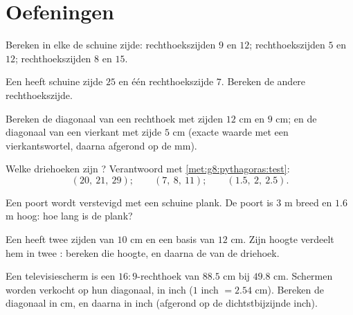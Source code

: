 \section{Oefeningen}

\begin{exercise}[$\star$]\label{exo:g8:pythagoras:1}
Bereken in elke  de schuine zijde:
rechthoekszijden $9$ en $12$; \quad rechthoekszijden $5$ en $12$; \quad
rechthoekszijden $8$ en $15$.
\end{exercise}

\begin{exercise}[$\star$]\label{exo:g8:pythagoras:2}
Een  heeft schuine zijde $25$ en één rechthoekszijde $7$.
Bereken de andere rechthoekszijde.
\end{exercise}

\begin{exercise}[$\star$]\label{exo:g8:pythagoras:3}
Bereken de diagonaal van een rechthoek met zijden $12$ cm en $9$ cm; en de
diagonaal van een vierkant met zijde $5$ cm (exacte waarde met een
vierkantswortel, daarna afgerond op de mm).
\end{exercise}

\begin{exercise}[$\star$]\label{exo:g8:pythagoras:4}
Welke driehoeken zijn ? Verantwoord met
\cref{met:g8:pythagoras:test}:
\[
(20,\ 21,\ 29); \qquad
(7,\ 8,\ 11); \qquad
(1.5,\ 2,\ 2.5).
\]
\end{exercise}

\begin{exercise}[$\star$]\label{exo:g8:pythagoras:5}
Een poort wordt verstevigd met een schuine plank. De poort is $3$ m breed en
$1.6$ m hoog: hoe lang is de plank?
\end{exercise}

\begin{exercise}[$\star$]\label{exo:g8:pythagoras:6}
Een  heeft twee zijden van $10$ cm en een basis van $12$ cm.
Zijn hoogte verdeelt hem in twee : bereken die hoogte, en
daarna de  van de driehoek.
\end{exercise}

\begin{exercise}[$\star\star$]\label{exo:g8:pythagoras:7}
Een televisiescherm is een $16{:}9$-rechthoek van $88.5$ cm bij $49.8$ cm.
Schermen worden verkocht op hun diagonaal, in inch ($1$ inch $= 2.54$ cm).
Bereken de diagonaal in cm, en daarna in inch (afgerond op de dichtstbijzijnde
inch).
\end{exercise}

